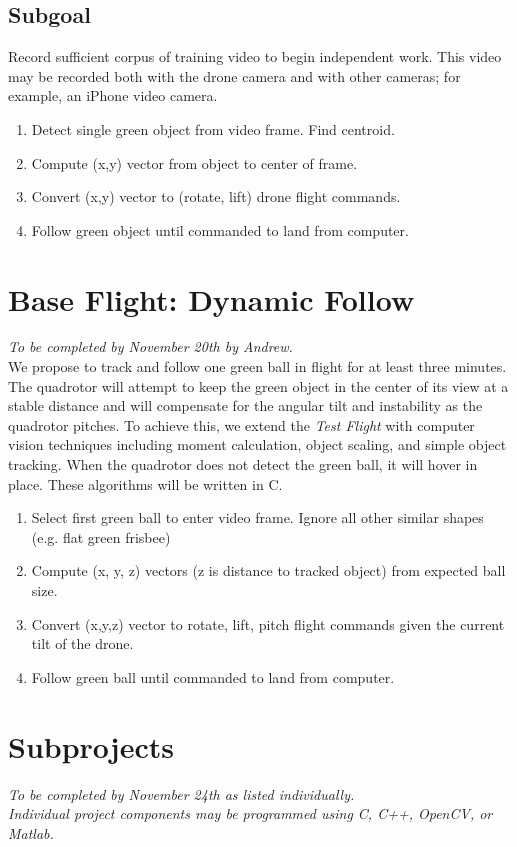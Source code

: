 \documentclass{article}
\begin{document}
\begin{spacing}{1.1}
\subsection{Subgoal} Record sufficient corpus of training video to begin
independent work. This video may be recorded both with the drone
camera and with other cameras; for example, an iPhone video camera.

\begin{enumerate}
\item Detect single green object from video frame. Find centroid.
\item Compute (x,y) vector from object to center of frame.
\item Convert (x,y) vector to (rotate, lift) drone flight commands.
\item Follow green object until commanded to land from computer.
\end{enumerate}

\section{Base Flight: Dynamic Follow}
\textit{To be completed by November 20th by Andrew.}\\

We propose to track and follow one green ball in flight for at least
three minutes. The quadrotor will attempt to keep the green object in
the center of its view at a stable distance and will compensate for
the angular tilt and instability as the quadrotor pitches. To achieve
this, we extend the \textit{Test Flight} with computer vision
techniques including moment calculation, object scaling, and simple
object tracking. When the quadrotor does not detect the green ball, it
will hover in place. These algorithms will be written in C.

\begin{enumerate}
\item Select first green ball to enter video frame. Ignore all other
similar shapes (e.g. flat green frisbee)
\item Compute (x, y, z) vectors (z is distance to tracked object) from
  expected ball size. 
\item Convert (x,y,z) vector to rotate, lift, pitch flight commands
  given the current tilt of the drone.
\item Follow green ball until commanded to land from computer.
\end{enumerate}

\section{Subprojects}
\textit{To be completed by November 24th as listed
  individually. \\\noindent Individual project components may be
  programmed using C, C++, OpenCV, or Matlab.}


\end{spacing}
\end{document}
